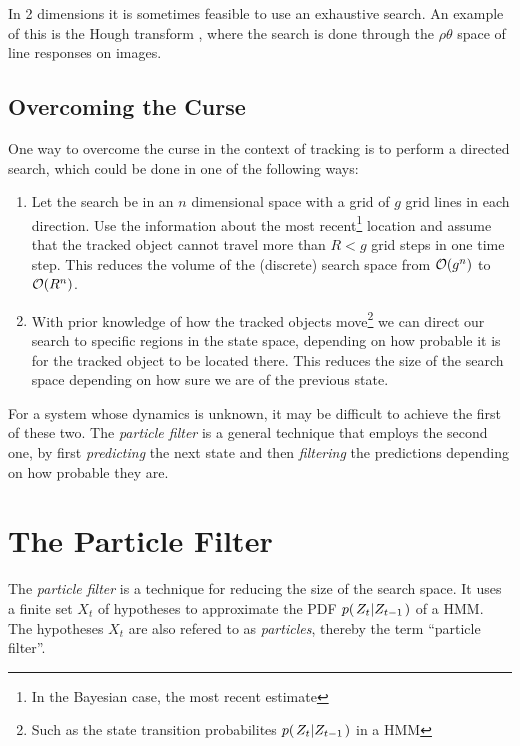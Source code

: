 \begin{example} In 2 dimensions it is sometimes feasible to use an
exhaustive search.  An example of this is the Hough transform
\cite{DigitalImageProcessing}, where the search is done through the
$\rho\theta$ space of line responses on images.
\end{example}

\subsection{Overcoming the Curse}
One way to overcome the curse in the context of tracking is to perform
a directed search, which could be done in one of the following ways:

\begin{enumerate}
\item Let the search be in an $n$ dimensional space with a grid of $g$
  grid lines in each direction. Use the information about the most
  recent\footnote{In the Bayesian case, the most recent estimate}
  location and assume that the tracked object cannot travel more than
  $R < g$ grid steps in one time step.  This reduces the volume of the
  (discrete) search space from $\mathcal{O}{\left(g^n\right)}$ to $\mathcal{O}{\left(R^n\right)}$.
\item With prior knowledge of how the tracked objects
  move\footnote{Such as the state transition probabilites
    $p{(\left. Z_t \middle\vert Z_{t-1} \right.)}$ in a HMM} we can direct our search to specific
  regions in the state space, depending on how probable it is for the
  tracked object to be located there. This reduces the size of the
  search space depending on how sure we are of the previous state.
\end{enumerate}

For a system whose dynamics is unknown, it may be difficult to achieve
the first of these two. The \emph{particle filter} is a general
technique that employs the second one, by first \emph{predicting} the
next state and then \emph{filtering} the predictions depending on how
probable they are.


\section{The Particle Filter}

The \emph{particle filter} is a technique for reducing the size of the
search space. It uses a finite set $X_t$ of hypotheses to approximate
the PDF $p{(\left. Z_t \middle\vert Z_{t-1} \right.)}$ of a HMM. The hypotheses $X_t$ are also
refered to as \emph{particles}, thereby the term ``particle filter''.

